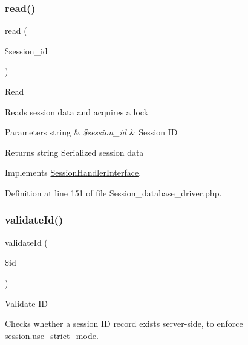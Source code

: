 \mbox{\label{class_c_i___session__database__driver_a5bbf84ebf657be4eaccc0582377c76bf}} 
\subsubsection{\texorpdfstring{read()}{read()}}
{\footnotesize\ttfamily read (\begin{DoxyParamCaption}\item[{}]{\$session\+\_\+id }\end{DoxyParamCaption})}

Read

Reads session data and acquires a lock


\begin{DoxyParams}[1]{Parameters}
string & {\em \$session\+\_\+id} & Session ID \\
\hline
\end{DoxyParams}
\begin{DoxyReturn}{Returns}
string Serialized session data 
\end{DoxyReturn}


Implements \mbox{\hyperlink{interface_session_handler_interface_a5bbf84ebf657be4eaccc0582377c76bf}{Session\+Handler\+Interface}}.



Definition at line 151 of file Session\+\_\+database\+\_\+driver.\+php.

\mbox{\label{class_c_i___session__database__driver_a4a58e8f59b2accc199bbebd5ee52bc74}} 
\subsubsection{\texorpdfstring{validateId()}{validateId()}}
{\footnotesize\ttfamily validate\+Id (\begin{DoxyParamCaption}\item[{}]{\$id }\end{DoxyParamCaption})}

Validate ID

Checks whether a session ID record exists server-\/side, to enforce session.\+use\+\_\+strict\+\_\+mode.



